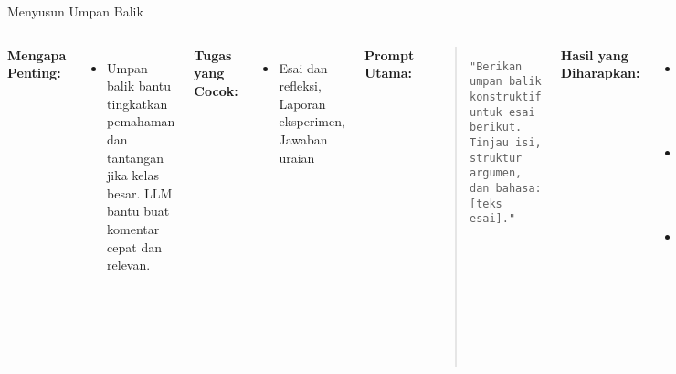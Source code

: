 \documentclass[aspectratio=169, table]{beamer}
\begin{document}
\begin{frame}[fragile]{Menyusun Umpan Balik}
	\vspace{20pt}
	\small
	\begin{columns}[T]
		\textbf{Mengapa Penting:}
		\begin{itemize}
			\item Umpan balik bantu tingkatkan pemahaman dan tantangan jika kelas besar. LLM bantu buat komentar cepat dan relevan.
		\end{itemize}
		
		\textbf{Tugas yang Cocok:}
		\begin{itemize}
			\item Esai dan refleksi, Laporan eksperimen, Jawaban uraian
		\end{itemize}
		
		\textbf{Prompt Utama:}
		\begin{quote}
			\centering
			\texttt{"Berikan umpan balik konstruktif untuk esai berikut. Tinjau isi, struktur argumen, dan bahasa: [teks esai]."}
		\end{quote}
		
		\textbf{Hasil yang Diharapkan:}
		\begin{itemize}
			\item Apresiasi terhadap kekuatan isi
			\item Koreksi dan saran konkret
			\item Nada sesuai konteks siswa
		\end{itemize}
		
		\textbf{Contoh Gaya Ramah:}
		\begin{quote}
			\centering
			\texttt{"Tulis umpan balik ramah dan memotivasi untuk siswa SMP."}
		\end{quote}
		
		\textbf{Tips Efektif:}
		\begin{itemize}
			\item Gunakan prompt yang jelas dan terarah
			\item Tinjau dan sesuaikan hasilnya
			\item Jadikan dasar diskusi atau refleksi siswa
		\end{itemize}
	\end{columns}
\end{frame}
\end{document}
